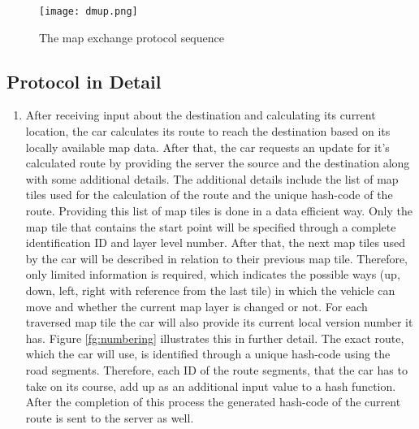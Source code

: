 \begin{figure}
\centering
\texttt{[image: dmup.png]}
\caption{The map exchange protocol sequence}
\label{fg:protocol}
\end{figure}



\subsection{Protocol in Detail}
\begin{enumerate}
\item After receiving input about the destination and calculating its current location, the car calculates its route to reach the destination based on its locally available map data. After that, the car requests an update for it's calculated route by providing the server the source and the destination along with some additional details. The additional details include the list of map tiles used for the calculation of the route and the unique hash-code of the route. Providing this list of map tiles is done in a data efficient way. Only the map tile that contains the start point will be specified through a complete identification ID and layer level number. After that, the next map tiles used by the car will be described in relation to their previous map tile. Therefore, only limited information is required, which indicates the possible ways (up, down, left, right with reference from the last tile) in which the vehicle can move and whether the current map layer is changed or not. For each traversed map tile the car will also provide its current local version number it has. Figure \ref{fg:numbering} illustrates this in further detail. The exact route, which the car will use, is identified through a unique hash-code using the road segments. Therefore, each ID of the route segments, that the car has to take on its course, add up as an additional input value to a hash function. After the completion of this process the generated hash-code of the current route is sent to the server as well.


\end{enumerate}
